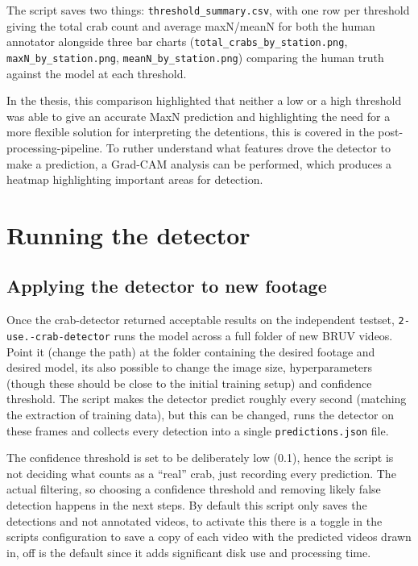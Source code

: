 \documentclass[
]{book}
\begin{document}
The script saves two things: \texttt{threshold\_summary.csv}, with one row per threshold
giving the total crab count and average maxN/meanN for both the human annotator alongside three bar charts (\texttt{total\_crabs\_by\_station.png}, \texttt{maxN\_by\_station.png}, \texttt{meanN\_by\_station.png}) comparing the human truth against the model at each threshold.

In the thesis, this comparison highlighted that neither a low or a high threshold was able to give an accurate MaxN prediction and highlighting the need for a more flexible solution for interpreting the detentions, this is covered in the post-processing-pipeline. To ruther understand what features drove the detector to make a prediction, a Grad-CAM analysis can be performed, which produces a heatmap highlighting important areas for detection.

\section{Running the detector}\label{running-the-detector}

\subsection{Applying the detector to new footage}\label{applying-the-detector-to-new-footage}

Once the crab-detector returned acceptable results on the independent testset, \texttt{2-use.-crab-detector} runs the model across a full folder of new BRUV videos. Point it (change the path) at the folder containing the desired footage and desired model, its also possible to change the image size, hyperparameters (though these should be close to the initial training setup) and confidence threshold. The script makes the detector predict roughly every second (matching the extraction of training data), but this can be changed, runs the detector on these frames and collects every detection into a single \texttt{predictions.json} file.

The confidence threshold is set to be deliberately low (0.1), hence the script is not deciding what counts as a ``real'' crab, just recording every prediction. The actual filtering, so choosing a confidence threshold and removing likely false detection happens in the next steps. By default this script only saves the detections and not annotated videos, to activate this there is a toggle in the scripts configuration to save a copy of each video with the predicted videos drawn in, off is the default since it adds significant disk use and processing time.
\end{document}
